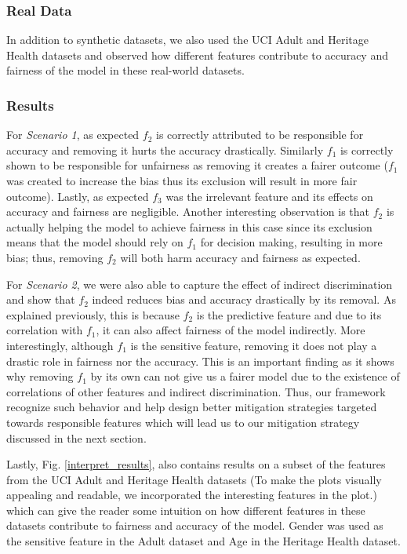 \subsubsection{Real Data}
In addition to synthetic datasets, we also used the UCI Adult and Heritage Health datasets and observed how different features contribute to accuracy and fairness of the model in these real-world datasets.
\subsubsection{Results}
For \textit{Scenario 1}, as expected $f_2$ is correctly attributed to be responsible for accuracy and removing it hurts the accuracy drastically. Similarly $f_1$ is correctly shown to be responsible for unfairness as removing it creates a fairer outcome ($f_1$ was created to increase the bias thus its exclusion will result in more fair outcome). Lastly, as expected $f_3$ was the irrelevant feature and its effects on accuracy and fairness are negligible. Another interesting observation is that $f_2$ is actually helping the model to achieve fairness in this case since its exclusion means that the model should rely on $f_1$ for decision making, resulting in more bias; thus, removing $f_2$ will both harm accuracy and fairness as expected.

For \textit{Scenario 2}, we were also able to capture the effect of indirect discrimination and show that $f_2$ indeed reduces bias and accuracy drastically by its removal. As explained previously, this is because $f_2$ is the predictive feature and due to its correlation with $f_1$, it can also affect fairness of the model indirectly. More interestingly, although $f_1$ is the sensitive feature, removing it does not play a drastic role in fairness nor the accuracy. This is an important finding as it shows why removing $f_1$ by its own can not give us a fairer model due to the existence of correlations of other features and indirect discrimination. Thus, our framework recognize such behavior and help design better mitigation strategies targeted towards responsible features which will lead us to our mitigation strategy discussed in the next section.

Lastly, Fig. \ref{interpret_results}, also contains results on a subset of the features from the UCI Adult and Heritage Health datasets (To make the plots visually appealing and readable, we incorporated the interesting features in the plot.) which can give the reader some intuition on how different features in these datasets contribute to fairness and accuracy of the model. Gender was used as the sensitive feature in the Adult dataset and Age in the Heritage Health dataset.

